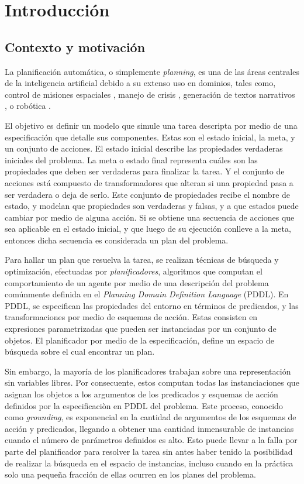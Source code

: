 \chapter{Introducción}
\label{ch:into}

\section{Contexto y motivación}
La planificación automática, o simplemente \emph{planning}, es una de las áreas
centrales de la inteligencia artificial debido a su extenso uso en dominios,
tales como, control de misiones espaciales \citep{RabideauG-et-al-2001}, manejo
de crisis \citep{Bienkowki-1995}, generación de textos narrativos
\citep{Goudoulakis-et-al-2016}, o robótica \citep{Munoz-et-al-2016}.

El objetivo es definir un modelo que simule una tarea descripta por medio de una
especificación que detalle sus componentes. Estas son el estado inicial, la
meta, y un conjunto de acciones. El estado inicial describe las propiedades
verdaderas iniciales del problema. La meta o estado final representa cuáles son
las propiedades que deben ser verdaderas para finalizar la tarea. Y el conjunto
de acciones está compuesto de transformadores que alteran si una propiedad pasa
a ser verdadera o deja de serlo. Este conjunto de propiedades recibe el nombre
de estado, y modelan que propiedades son verdaderas y falsas, y a que estados
puede cambiar por medio de alguna acción. Si se obtiene una secuencia de
acciones que sea aplicable en el estado inicial, y que luego de su ejecución
conlleve a la meta, entonces dicha secuencia es considerada un plan del
problema.

Para hallar un plan que resuelva la tarea, se realizan técnicas de búsqueda y
optimización, efectuadas por \emph{planificadores}, algoritmos que computan el
comportamiento de un agente por medio de una descripción del problema comúnmente
definida en el \emph{Planning Domain Definition Language} (PDDL). En PDDL, se
especifican las propiedades del entorno en términos de predicados, y las
transformaciones por medio de esquemas de acción. Estas consisten en expresiones
parametrizadas que pueden ser instanciadas por un conjunto de objetos. El
planificador por medio de la especificación, define un espacio de búsqueda sobre
el cual encontrar un plan.

Sin embargo, la mayoría de los planificadores trabajan sobre una representación
sin variables libres. Por consecuente, estos computan todas las instanciaciones
que asignan los objetos a los argumentos de los predicados y esquemas de acción
definidos por la especificaciòn en PDDL del problema. Este proceso, conocido como
\emph{grounding}, es exponencial en la cantidad de argumentos de los esquemas de
acción y predicados, llegando a obtener una cantidad inmensurable de instancias
cuando el número de parámetros definidos es alto. Esto puede llevar a la falla
por parte del planificador para resolver la tarea sin antes haber tenido la
posibilidad de realizar la búsqueda en el espacio de instancias, incluso cuando
en la práctica solo una pequeña fracción de ellas ocurren en los planes del
problema.
\citep{Gnad_Torralba_Dominguez_Areces_Bustos_2019}


